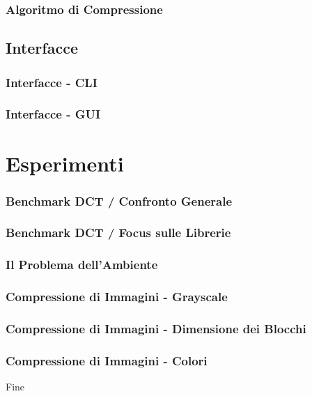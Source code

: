 \documentclass{beamer}
\begin{document}
\begin{frame}
\frametitle{Algoritmo di Compressione}
\end{frame}

\subsection{Interfacce}

\begin{frame}
\frametitle{Interfacce - CLI}
\end{frame}

\begin{frame}
\frametitle{Interfacce - GUI}
\end{frame}

\section{Esperimenti}

\begin{frame}
\frametitle{Benchmark DCT / Confronto Generale}
\end{frame}

\begin{frame}
\frametitle{Benchmark DCT / Focus sulle Librerie}
\end{frame}

\begin{frame}
\frametitle{Il Problema dell'Ambiente}
\end{frame}

\begin{frame}
\frametitle{Compressione di Immagini - Grayscale}
\end{frame}

\begin{frame}
\frametitle{Compressione di Immagini - Dimensione dei Blocchi}
\end{frame}

\begin{frame}
\frametitle{Compressione di Immagini - Colori}
\end{frame}

\begin{frame}
\centering
\Huge
Fine
\end{frame}
\end{document}
